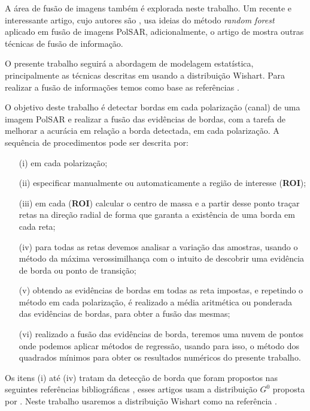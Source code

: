 A área de fusão de imagens também é explorada neste trabalho. Um recente e interessante artigo, cujo autores são \citet{sglmla}, usa ideias do método \textit{random forest} aplicado em fusão de imagens PolSAR, adicionalmente, o artigo de \citet{sg} mostra outras técnicas de fusão de informação.  

O presente trabalho seguirá a abordagem de modelagem estatística, principalmente as técnicas descritas em \citep{fbgm, nhfc} usando a distribuição Wishart. Para realizar a fusão de informações temos como base as referências \citep{mit, sglmla, sg}. 

O objetivo deste trabalho é detectar bordas em cada polarização (canal) de uma imagem PolSAR e realizar a fusão das evidências de bordas, com a tarefa de melhorar a acurácia em relação a borda detectada, em cada polarização. A sequência de procedimentos pode ser descrita por:
\begin{itemize}
	\item[(i)] em cada polarização;
	\item[(ii)] especificar manualmente ou automaticamente a região de interesse (\textbf{ROI});
	\item[(iii)] em cada (\textbf{ROI}) calcular o centro de massa e a partir desse ponto traçar retas na direção radial de forma que garanta a existência de uma borda em cada reta;
	\item[(iv)] para todas as retas devemos analisar a variação das amostras, usando o método da máxima verossimilhança com o intuito de descobrir uma evidência de borda ou ponto de transição;
	\item[(v)] obtendo as evidências de bordas em todas as reta impostas, e repetindo o método em cada polarização, é realizado a média aritmética ou ponderada das evidências de bordas, para obter a fusão das mesmas;
	\item[(vi)] realizado a fusão das evidências de borda, teremos uma nuvem de pontos onde podemos aplicar métodos de regressão, usando para isso, o método dos quadrados mínimos para obter os resultados numéricos do presente trabalho.
\end{itemize}

Os itens (i) até (iv) tratam da detecção de borda que foram propostos nas seguintes referências bibliográficas \citep{gmbf, gmbf_sc, fbgm}, esses artigos usam a distribuição $G^{0}$ proposta por \citet{fmcs}. Neste trabalho usaremos a distribuição Wishart como na referência \citep{nhfc}. 

